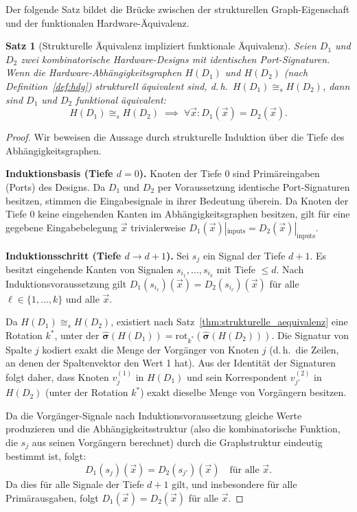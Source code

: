 ﻿\documentclass[12pt,a4paper]{report}
\newtheorem{theorem}{Satz}[section]
\begin{document}
Der folgende Satz bildet die Brücke zwischen der strukturellen Graph-Eigenschaft und der funktionalen Hardware-Äquivalenz.

\begin{theorem}[Strukturelle Äquivalenz impliziert funktionale Äquivalenz]
\label{thm:struktur_impliziert_funktion}
Seien $D_1$ und $D_2$ zwei kombinatorische Hardware-Designs mit identischen Port-Signaturen. Wenn die Hardware-Abhängigkeitsgraphen $H(D_1)$ und $H(D_2)$ (nach Definition~\ref{def:hdg}) strukturell äqui\-valent sind, d.\,h.\ $H(D_1) \cong_s H(D_2)$, dann sind $D_1$ und $D_2$ funktional äquivalent:
\[
H(D_1) \cong_s H(D_2) \;\implies\; \forall \vec{x} : D_1(\vec{x}) = D_2(\vec{x}).
\]
\end{theorem}

\begin{proof}
Wir beweisen die Aussage durch strukturelle Induktion über die Tiefe des Abhängigkeitsgraphen.

\textbf{Induktionsbasis (Tiefe $d = 0$).}
Knoten der Tiefe 0 sind Primäreingaben (Ports) des Designs. Da $D_1$ und $D_2$ per Voraussetzung identische Port-Signaturen besitzen, stimmen die Eingabesignale in ihrer Bedeutung überein. Da Knoten der Tiefe 0 keine eingehenden Kanten im Abhängigkeitsgraphen besitzen, gilt für eine gegebene Eingabebelegung $\vec{x}$ trivialerweise $D_1(\vec{x})|_{\mathrm{inputs}} = D_2(\vec{x})|_{\mathrm{inputs}}$.

\textbf{Induktionsschritt (Tiefe $d \to d+1$).}
Sei $s_j$ ein Signal der Tiefe $d+1$. Es besitzt eingehende Kanten von Signalen $s_{i_1}, \ldots, s_{i_k}$ mit Tiefe $\leq d$. Nach Induktionsvoraussetzung gilt $D_1(s_{i_\ell})(\vec{x}) = D_2(s_{i_\ell})(\vec{x})$ für alle $\ell \in \{1,\ldots,k\}$ und alle $\vec{x}$.

Da $H(D_1) \cong_s H(D_2)$, existiert nach Satz~\ref{thm:strukturelle_aequivalenz} eine Rotation $k^*$, unter der $\hat{\boldsymbol{\sigma}}(H(D_1)) = \mathrm{rot}_{k^*}(\hat{\boldsymbol{\sigma}}(H(D_2)))$. Die Signatur von Spalte $j$ kodiert exakt die Menge der Vorgänger von Knoten $j$ (d.\,h.\ die Zeilen, an denen der Spaltenvektor den Wert 1 hat). Aus der Identität der Signaturen folgt daher, dass Knoten $v_j^{(1)}$ in $H(D_1)$ und sein Korrespondent $v_{j'}^{(2)}$ in $H(D_2)$ (unter der Rotation $k^*$) exakt dieselbe Menge von Vorgängern besitzen.

Da die Vorgänger-Signale nach Induktionsvoraussetzung gleiche Werte produzieren und die Abhängigkeitsstruktur (also die kombinatorische Funktion, die $s_j$ aus seinen Vorgängern berechnet) durch die Graphstruktur eindeutig bestimmt ist, folgt:
\[
D_1(s_j)(\vec{x}) = D_2(s_{j'})(\vec{x}) \quad \text{für alle } \vec{x}.
\]
Da dies für alle Signale der Tiefe $d+1$ gilt, und insbesondere für alle Primärausgaben, folgt $D_1(\vec{x}) = D_2(\vec{x})$ für alle $\vec{x}$.
\end{proof}
\end{document}
